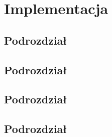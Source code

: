 \chapter{Implementacja} \label{chap:implementation}

\section{Podrozdział}

\bt

\section{Podrozdział}

\bt

\section{Podrozdział}

\bt

\section{Podrozdział}

\bt
